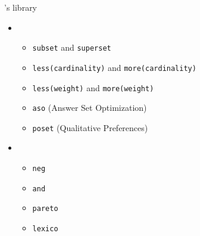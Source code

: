 \begin{frame}{\asprin's library}
  \begin{itemize}
  \item<1-> 
    \begin{itemize}
    \item  \texttt{subset} and \texttt{superset}
    \item  \texttt{less(cardinality)} and \texttt{more(cardinality)}
    \item  \texttt{less(weight)} and \texttt{more(weight)}
    \item  \texttt{aso}   (Answer Set Optimization) \nocite{brnitr03a}
    \item  \texttt{poset} (Qualitative Preferences) \nocite{rogima10a}
    \end{itemize}
    \smallskip
  \item<2->  \nocite{sonpon06a}
    \begin{itemize}
    \item \texttt{neg}
    \item \texttt{and}
    \item \texttt{pareto}
    \item \texttt{lexico}
    \end{itemize}
  \end{itemize}
\end{frame}
%
